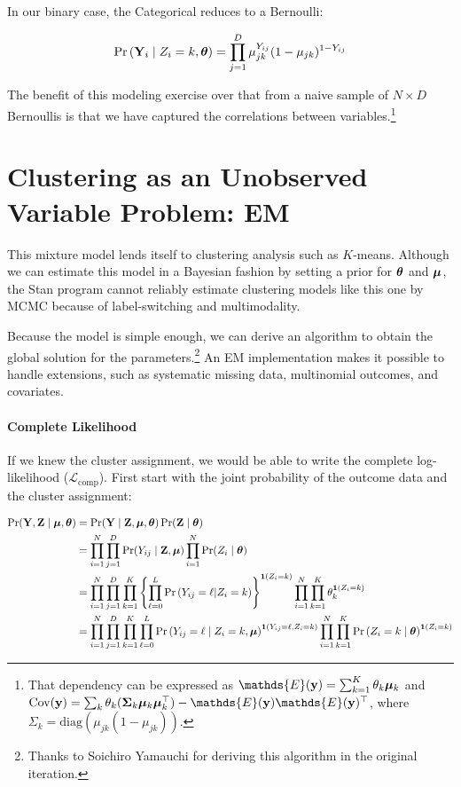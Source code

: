 \documentclass[11pt]{article}
\begin{document}
In our binary case, the Categorical reduces to a Bernoulli:

\begin{align}
\mathbb{\Pr}\left(\mathbf{Y}_{i} \mid Z_{i} = k, \bm{\theta}\right) = \prod^{D}_{j=1}\mu_{jk}^{Y_{ij}}(1 - \mu_{jk})^{1- Y_{ij}}
\end{align}




The benefit of this modeling exercise over that from a naive sample of
\(N \times D\) Bernoullis is that we have captured the correlations
between variables.\footnote{That dependency can be expressed as \(\mathds{E}(\by) = \sum_{k = 1}^{K} \theta_{k} \bmu_{k}\) and 
\(\cov({\by}) = \sum_{k} \theta_{k} (\mathbf{\Sigma}_k \bmu_k\bmu_{k}^{\top}) - \mathds{E}(\by)\mathds{E}(\by)^\top\), where \(\Sigma_k = \text{diag}(\mu_{jk}(1 - \mu_{jk}))\).}


\section{Clustering as an Unobserved Variable Problem: EM}

This mixture model lends itself to clustering analysis such as \(K\)-means. Although we can estimate this model in a Bayesian fashion by setting a prior for \(\bm{\theta}\) and \(\bm{\mu}\), the \textsf{Stan} program cannot reliably estimate clustering models like this one by MCMC because of label-switching and multimodality. 

Because the model is simple enough, we can derive an algorithm to obtain the global solution for the parameters.\footnote{Thanks to Soichiro Yamauchi for deriving this algorithm in the original iteration.} An EM implementation makes it possible to handle extensions, such as systematic missing data, multinomial outcomes, and covariates. 

\paragraph{Complete Likelihood} If we knew the cluster assignment, we would be able to write the complete log-likelihood (\(\mathcal{L}_{\text{comp}}\)). First start with the joint probability of the outcome data and the cluster assignment:

\begin{align}
\Pr(\mathbf{Y}, \mathbf{Z} \mid \bm{\mu}, \bm{\theta}) &= \Pr(\mathbf{Y} \mid \mathbf{Z}, \bm{\mu}, \bm{\theta})\Pr(\mathbf{Z} \mid \bm{\theta})\nonumber\\
&= \prod^{N}_{i=1}\prod^{D}_{j=1}\Pr(Y_{ij} \mid \mathbf{Z}, \bm{\mu}) \prod^N_{i=1}\Pr(Z_i \mid \bm{\theta})\nonumber\\
&= \prod^{N}_{i=1}\prod^{D}_{j=1}\prod^{K}_{k=1}\left\{\prod^{L}_{\ell=0}\mathbb{\Pr}\left(Y_{ij} = \ell | Z_i = k\right)\right\}^{\bm{1}\left(Z_i=k\right)} \prod^N_{i=1}\prod^K_{k=1}\theta_{k}^{\bm{1}\left(Z_i = k\right)}\nonumber \\
&= \prod^{N}_{i=1}\prod^{D}_{j=1}\prod^{K}_{k=1}\prod^{L}_{\ell=0}\mathbb{\Pr}\left(Y_{ij} = \ell \mid Z_{i} = k, \bm{\mu}\right)^{\bm{1}\left(Y_{ij} = \ell, Z_i = k\right)} \prod^N_{i=1}\prod^K_{k=1}\mathbb{\Pr}\left(Z_i = {k} \mid \bm{\theta}\right)^{\bm{1}\left(Z_i = k\right)}\nonumber
\end{align}
\end{document}
